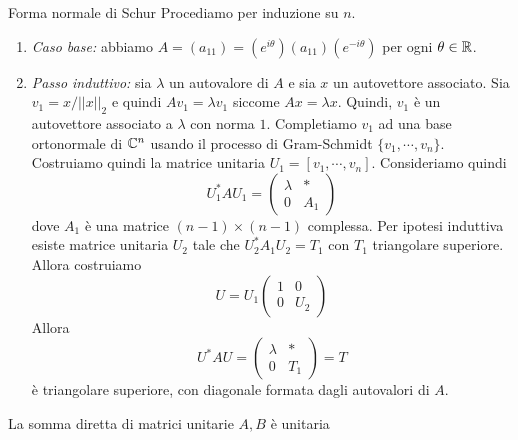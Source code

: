 \documentclass[a4paper]{article}
\begin{document}
\begin{snippetproof}{Forma normale di Schur}
    Procediamo per induzione su \(n\).
    \begin{enumerate}
        \item \emph{Caso base:} abbiamo \(A = (a_{11}) = (e^{i\theta})(a_{11})(e^{-i\theta})\)
            per ogni \(\theta \in \mathbb{R}\).
        \item \emph{Passo induttivo:} sia \(\lambda\) un autovalore di \(A\)
            e sia \(x\) un autovettore associato.
            Sia \(v_1 = x/||x||_2\) e quindi \(Av_1 = \lambda v_1\) siccome \(Ax = \lambda x\).
            Quindi, \(v_1\) è un autovettore associato a \(\lambda\) con norma \(1\).
            Completiamo \(v_1\) ad una base ortonormale di \(\mathbb{C}^n\) usando il processo di Gram-Schmidt \(\{v_1, \cdots, v_n\}\).
            Costruiamo quindi la matrice unitaria \(U_1 = [v_1, \cdots, v_n]\). Consideriamo quindi
            \[
                U_1^* A U_1 =
                \begin{pmatrix}
                    \lambda & \ast \\ 0 & A_1
                \end{pmatrix}
            \]
            dove \(A_1\) è una matrice \((n-1) \times (n-1)\) complessa.
            Per ipotesi induttiva esiste matrice unitaria \(U_2\) tale che \(U_2^* A_1 U_2 = T_1\) con \(T_1\) triangolare superiore.
            Allora costruiamo
            \[
                U = U_1
                \begin{pmatrix}
                    1 & 0 \\ 0 & U_2
                \end{pmatrix}
            \]
            Allora
            \[
                U^* A U =
                \begin{pmatrix}
                    \lambda & \ast \\ 0 & T_1
                \end{pmatrix} = T
            \]
            è triangolare superiore, con diagonale formata dagli autovalori di \(A\).
    \end{enumerate}
\end{snippetproof}

\begin{snippetproposition}{}
    La somma diretta di matrici unitarie \(A,B\) è unitaria
\end{snippetproposition}
\end{document}
